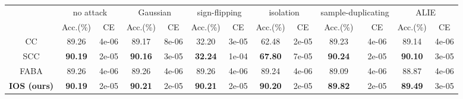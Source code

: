 \begin{tabular}{c|cc|cc|cc|cc|cc|cc}
\hline\hline
\multirow{2}{*}{}&\multicolumn{2}{c|}{no attack}&\multicolumn{2}{c|}{Gaussian}&\multicolumn{2}{c|}{sign-flipping}&\multicolumn{2}{c|}{isolation}&\multicolumn{2}{c|}{sample-duplicating}&\multicolumn{2}{c}{ALIE}\\
& Acc.(\%) & CE & Acc.(\%) & CE & Acc.(\%) & CE & Acc.(\%) & CE & Acc.(\%) & CE & Acc.(\%) & CE \\
\hline
CC & {89.26} & {4e-06} & {89.17} & {8e-06} & {32.20} & {3e-05} & {62.48} & {2e-05} & {89.23} & {4e-06} & {89.14} & {4e-06}\\
SCC & \textbf{90.19} & {2e-05} & \textbf{90.16} & {3e-05} & \textbf{32.24} & {1e-04} & \textbf{67.80} & {7e-05} & \textbf{90.24} & {2e-05} & \textbf{90.10} & {3e-05}\\
\hline
FABA & {89.26} & {4e-06} & {89.26} & {4e-06} & {89.26} & {4e-06} & {89.24} & {4e-06} & {89.09} & {4e-06} & {88.87} & {4e-06}\\
\textbf{IOS (ours)} & \textbf{90.19} & {2e-05} & \textbf{90.21} & {2e-05} & \textbf{90.21} & {2e-05} & \textbf{90.20} & {2e-05} & \textbf{89.82} & {2e-05} & \textbf{89.49} & {3e-05}\\
\hline
\hline
\end{tabular}
